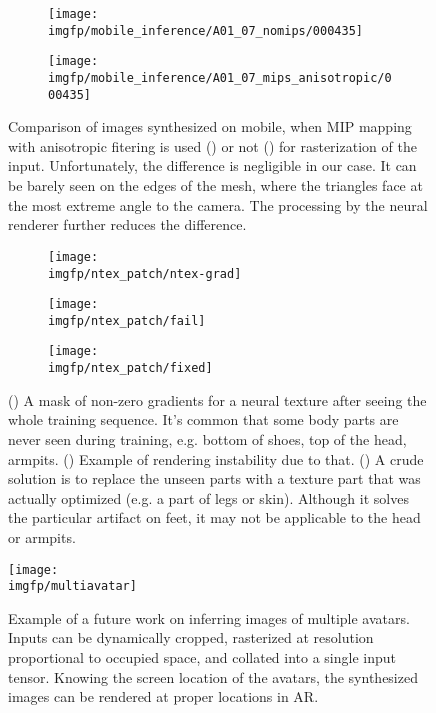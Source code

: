\begin{figure}
	\centering
	\begin{subfigure}[b]{0.49\textwidth}
		\centering
		\texttt{[image: \\imgfp/mobile\_inference/A01\_07\_nomips/000435]}%
		\caption{}
		\label{appb:aux:no_mipmap_inference}
	\end{subfigure}
	\hfill
	\begin{subfigure}[b]{0.49\textwidth}
		\centering
		\texttt{[image: \\imgfp/mobile\_inference/A01\_07\_mips\_anisotropic/000435]}
		\caption{}
		\label{appb:aux:anisotropic_inference}
	\end{subfigure}
	\caption{Comparison of images synthesized on mobile, when MIP mapping with anisotropic fitering is used (\protect{}) or not (\protect{}) for rasterization of the input. Unfortunately, the difference is negligible in our case. It can be barely seen on the edges of the mesh, where the triangles face at the most extreme angle to the camera. The processing by the neural renderer further reduces the difference.}
\end{figure}
\begin{figure}
	\centering
	\begin{subfigure}[b]{0.35\textwidth}
		\centering
		\texttt{[image: \\imgfp/ntex\_patch/ntex-grad]}%
		\caption{}
		\label{appb:aux:ntex-grad}
	\end{subfigure}
	\hfill
	\begin{subfigure}[b]{0.3\textwidth}
		\centering
		\texttt{[image: \\imgfp/ntex\_patch/fail]}
		\caption{}
		\label{appb:aux:ntex-artifact}
	\end{subfigure}
	\hfill
	\begin{subfigure}[b]{0.3\textwidth}
		\centering
		\texttt{[image: \\imgfp/ntex\_patch/fixed]}
		\caption{}
		\label{appb:aux:ntex-fixed}
	\end{subfigure}
	\caption{(\protect{}) A mask of non-zero gradients for a neural texture after seeing the whole training sequence. It's common that some body parts are never seen during training, e.g. bottom of shoes, top of the head, armpits. (\protect{}) Example of rendering instability due to that. (\protect{}) A crude solution is to replace the unseen parts with a texture part that was actually optimized (e.g. a part of legs or skin). Although it solves the particular artifact on feet, it may not be applicable to the head or armpits.}
\end{figure}
\begin{figure}
	\centering%
	\setlength\abovedisplayskip{0pt}%
	\texttt{[image: \\imgfp/multiavatar]}%
	\caption{Example of a future work on inferring images of multiple avatars. Inputs can be dynamically cropped, rasterized at resolution proportional to occupied space, and collated into a single input tensor. Knowing the screen location of the avatars, the synthesized images can be rendered at proper locations in AR.}%
	\label{appb:aux:multiavatar}%
	\setlength\belowdisplayskip{0pt}%
\end{figure}
\clearpage
\newpage

